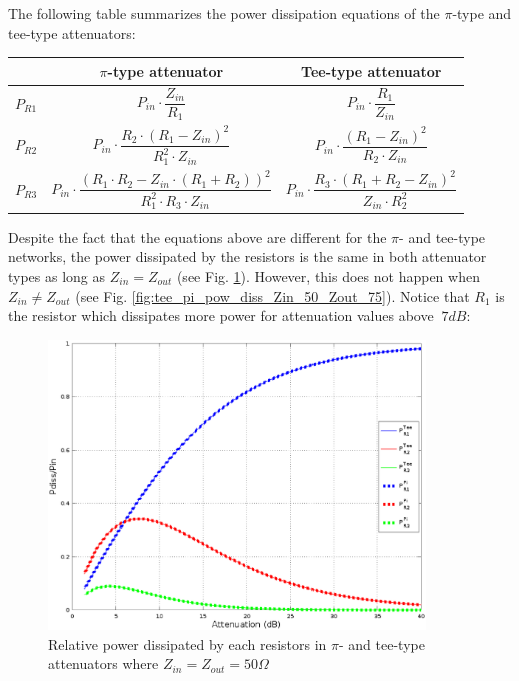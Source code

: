 \noindent The following table summarizes the power dissipation equations of the $\pi$-type and  tee-type attenuators:

\begin{center}
\begin{tabular}{| c | c | c| }
\hline 
 & \textbf{$\pi$-type attenuator} & \textbf{Tee-type attenuator} \\ \hline                        
$P_{R1}$ & $ P_{in}\cdot \dfrac{Z_{in}}{R_1}$ &  $ P_{in}\cdot \dfrac{R_1}{Z_{in}}$ \\ \hline  
$P_{R2}$ & $P_{in}\cdot \dfrac{R_2 \cdot (R_1 - Z_{in})^2}{R_1^2 \cdot Z_{in}}$ & $P_{in}\cdot \dfrac{ (R_1 - Z_{in})^2}{R_2 \cdot Z_{in}}$ \\ \hline  
$P_{R3}$ & $P_{in} \cdot \dfrac{(R_1 \cdot R_2 - Z_{in} \cdot (R_1 + R_2))^2}{R_1^2 \cdot R_3 \cdot Z_{in}}$ & $P_{in} \cdot \dfrac{R_3 \cdot (R_1 + R_2 - Z_{in})^2}{Z_{in} \cdot R_2^2}$  \\   
\hline  
\end{tabular}
\end{center}

\noindent Despite the fact that the equations above are different for the $\pi$- and tee-type networks, the power dissipated by the resistors is the same in both attenuator types as long as $Z_{in} = Z_{out}$ (see Fig. \ref{fig:tee_pi_pow_diss_Zin_Zout_Z0}). However, this does not happen when $Z_{in} \neq Z_{out}$ (see Fig. \ref{fig:tee_pi_pow_diss_Zin_50_Zout_75}). Notice that $R_{1}$ is the resistor which dissipates more power for attenuation values above $~7dB$:

\begin{figure}[ht]
\begin{center}
\includegraphics[width=10cm]{Relative-dissipated-power-pi-tee-Zin-Zout-Z0}
\end{center}
\caption{Relative power dissipated by each resistors in $\pi$- and tee-type attenuators where $Z_{in} = Z_{out} = 50 \Omega$}
\label{fig:tee_pi_pow_diss_Zin_Zout_Z0}
\end{figure}
\FloatBarrier

